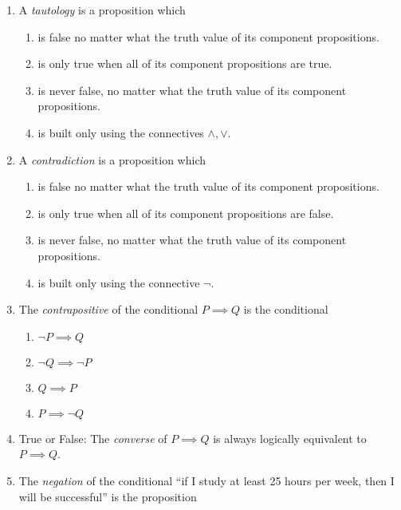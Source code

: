 \begin{enumerate}
  \item A \emph{tautology} is a proposition which \underline{\phantom{is always true}\qquad\qquad}
  \begin{enumerate}
      \item is false no matter what the truth value of its component propositions.
      \item is only true when all of its component propositions are true.
      \item is never false, no matter what the truth value of its component propositions.
      \item is built only using the connectives $\land, \lor$.
  \end{enumerate}
  \item A \emph{contradiction} is a proposition which \underline{\phantom{is always false}\qquad\qquad}
  \begin{enumerate}
      \item is false no matter what the truth value of its component propositions.
      \item is only true when all of its component propositions are false.
      \item is never false, no matter what the truth value of its component propositions.
      \item is built only using the connective $\neg$.
  \end{enumerate}
  \item The \emph{contrapositive} of the conditional $P\implies Q$ is the conditional \underline{\phantom{$\not Q\implies\not P$}\qquad\qquad}
  \begin{enumerate}
      \item $\neg P \implies Q$
      \item $\neg Q \implies \neg P$
      \item $Q \implies P$
      \item $P \implies \neg Q$
  \end{enumerate}
  \item True or False: The \emph{converse} of $P\implies Q$ is always logically equivalent to $P\implies Q$.
  \item The \emph{negation} of the conditional ``if I study at least 25 hours per week, then I will be successful'' is the proposition \underline{\phantom{$\not Q\implies\not P$}\qquad\qquad}

\end{enumerate}

